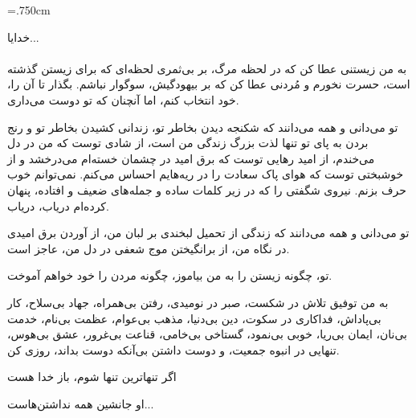 
\clearpage\newpage
\baselineskip=.750cm
\thispagestyle{empty}
 
{\nastaliq
خدایا...%
}\\
\vspace{.5cm}\\
به من زیستنی عطا کن که در لحظه مرگ، بر بی‌ثمری لحظه‌ای که برای زیستن گذشته است، حسرت نخورم   و مُردنی عطا کن که بر بیهودگیش، سوگوار نباشم. بگذار تا آن را، خود انتخاب کنم، اما آنچنان که تو دوست می‌داری.

تو می‌دانی و همه می‌دانند که شکنجه دیدن بخاطر تو، زندانی کشیدن بخاطر تو و رنج بردن به پای تو تنها لذت بزرگ زندگی من است، از شادی توست که من در دل می‌خندم، از امید رهایی توست که برق امید در چشمان خسته‌ام می‌درخشد و از خوشبختی توست که هوای پاک سعادت را در ریه‌هایم احساس می‌کنم. نمی‌توانم خوب حرف بزنم. نیروی شگفتی را که در زیر کلمات ساده و جمله‌های ضعیف و افتاده، پنهان کرده‌ام دریاب، دریاب.

تو می‌دانی و همه می‌دانند که زندگی از تحمیل لبخندی بر لبان من، از آوردن برق امیدی در نگاه من، از برانگیختن موج شعفی در دل من، عاجز است.

تو، چگونه زیستن را به من بیاموز، چگونه مردن را خود خواهم آموخت.

به من توفیق تلاش در شکست، صبر در نومیدی، رفتن بی‌همراه، جهاد بی‌سلاح، کار بی‌پاداش، فداکاری در سکوت، دین بی‌دنیا، مذهب بی‌عوام، عظمت بی‌نام، خدمت بی‌نان، ایمان بی‌ریا، خوبی بی‌نمود، گستاخی بی‌خامی، قناعت بی‌غرور، عشق بی‌هوس، تنهایی در انبوه جمعیت، و دوست داشتن بی‌آنکه دوست بداند،  روزی کن. 

\vspace{1.5cm}
{\nastaliq
\hspace{1cm}
اگر تنها‌ترین تنها شوم، باز خدا هست
\vspace{.8cm}

\hspace{4.7cm}
او جانشین همه نداشتن‌هاست...
}
